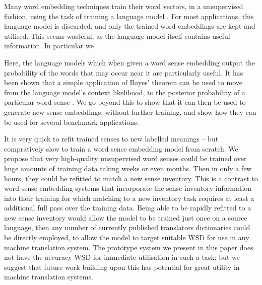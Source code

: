 Many word embedding techniques train their word vectors, in a unsupervised fashion, using the task of training a language model \parencite{NPLM, collobert2008unified, mikolov2013efficient}.
For most applications, this language model is discarded, and only the trained word embeddings are kept and utilised.
This seems wasteful, as the language model itself contains useful information. In particular we


Here, the language models which when given a word sense embedding output the probability of the words that may occur near it are particularly useful. It has been shown that a simple application of Bayes' theorem can be used to move from the language model's context likelihood, to the posterior probability of a particular word sense \cite{tian2014probabilistic,AdaGrams}. We go beyond this to show that it can then be used to generate new sense embeddings, without further training, and show how they can be used for several benchmark applications.



It is very quick to refit trained senses to new labelled meanings -- but compratively slow to train a word sense embedding model from scratch. We propose that very high-quality unsupervised word senses could be trained over huge amounts of training data taking weeks or even months. Then in only a few hours, they could be refitted to match a new sense inventory.  This is a contrast to word sense embedding systems that incorporate the sense inventory information into their training \parencite{Chen2014, iacobacci2015sensembed} for which matching to a new inventory task requires at least a additional full pass over the training data.
Being able to be rapidly refitted to a new sense inventory would allow the model to be trained just once on a source language, then any number of currently published translators dictionaries could be directly employed, to allow the model to target suitable WSD for use in any machine translation system. The prototype system we present in this paper does not have the accuracy WSD for immediate utilisation in such a task; but we suggest that future work building upon this has potential for great utility in machine translation systems.